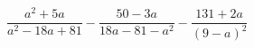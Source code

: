 \begin{ex}[type=expression]
	\begin{condition}
		\( \dfrac{a^2+5a}{a^2-18a+81}-\dfrac{50-3a}{18a-81-a^2}-\dfrac{131+2a}{(9-a)^2} \)
	\end{condition}
\end{ex}